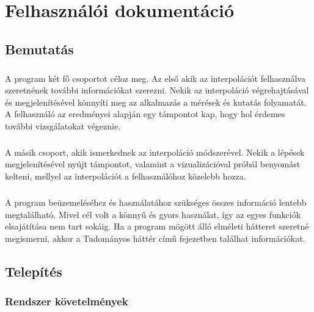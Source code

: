 \documentclass[12pt]{report}
\begin{document}
\chapter{Felhasználói dokumentáció}

\section{Bemutatás}
\paragraph{}
A program két fő csoportot céloz meg. Az első akik az interpolációt felhasználva szeretnének további információkat szerezni. Nekik az interpoláció végrehajtásával és megjelenítésével könnyíti meg az alkalmazás a mérések és kutatás folyamatát. A felhasználó az eredményei alapján egy támpontot kap, hogy hol érdemes további vizsgálatokat végeznie.
\paragraph{}
A másik csoport, akik ismerkednek az interpoláció módszerével. Nekik a lépések megjelenítésével nyújt támpontot, valamint a vizualizációval próbál benyomást kelteni, mellyel az interpolációt a felhasználóhoz közelebb hozza.
\paragraph{}
A program beüzemeléséhez és használatához szükséges összes információ lentebb megtalálható. Mivel cél volt a könnyű és gyors használat, így az egyes funkciók elsajátítása nem tart sokáig. Ha a program mögött álló elméleti hátteret szeretné megismerni, akkor a Tudományos háttér című fejezetben találhat információkat.

\section{Telepítés}

\subsection{Rendszer követelmények}
\end{document}
